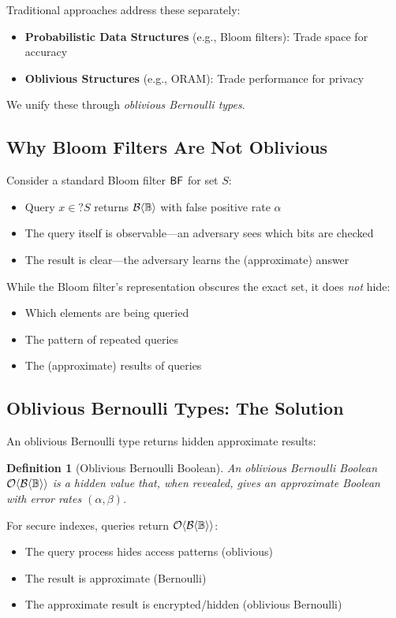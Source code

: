 \documentclass[11pt,final]{article}
\newcommand{\BernBool}{\mathcal{B}\langle \Bool \rangle}
\newcommand{\fprate}{\alpha}
\newcommand{\fnrate}{\beta}
\newtheorem{definition}[theorem]{Definition}
\begin{document}
Traditional approaches address these separately:
\begin{itemize}
    \item \textbf{Probabilistic Data Structures} (e.g., Bloom filters): Trade space for accuracy
    \item \textbf{Oblivious Structures} (e.g., ORAM): Trade performance for privacy
\end{itemize}

We unify these through \emph{oblivious Bernoulli types}.

\subsection{Why Bloom Filters Are Not Oblivious}

Consider a standard Bloom filter $\mathsf{BF}$ for set $S$:
\begin{itemize}
    \item Query $x \in? S$ returns $\BernBool$ with false positive rate $\fprate$
    \item The query itself is observable—an adversary sees which bits are checked
    \item The result is clear—the adversary learns the (approximate) answer
\end{itemize}

While the Bloom filter's representation obscures the exact set, it does \emph{not} hide:
\begin{itemize}
    \item Which elements are being queried
    \item The pattern of repeated queries
    \item The (approximate) results of queries
\end{itemize}

\subsection{Oblivious Bernoulli Types: The Solution}

An oblivious Bernoulli type returns hidden approximate results:

\begin{definition}[Oblivious Bernoulli Boolean]
An oblivious Bernoulli Boolean $\Obv{\BernBool}$ is a hidden value that, when revealed, gives an approximate Boolean with error rates $(\fprate, \fnrate)$.
\end{definition}

For secure indexes, queries return $\Obv{\BernBool}$:
\begin{itemize}
    \item The query process hides access patterns (oblivious)
    \item The result is approximate (Bernoulli)
    \item The approximate result is encrypted/hidden (oblivious Bernoulli)
\end{itemize}
\end{document}
